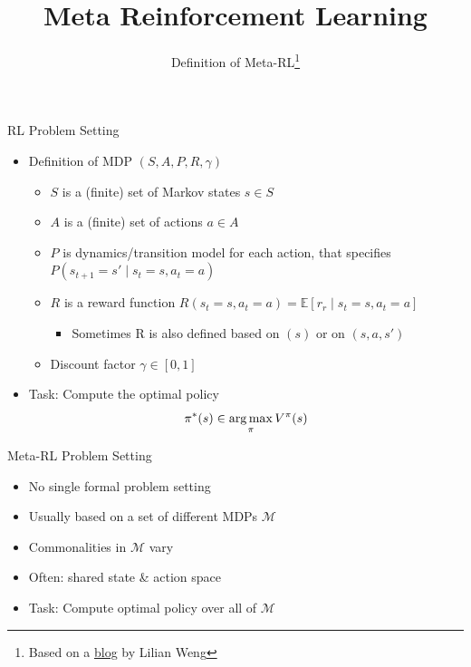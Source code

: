


\title[Meta-RL]{Meta Reinforcement Learning}
\subtitle{Definition of Meta-RL\footnote{Based on a \href{https://lilianweng.github.io/lil-log/2019/06/23/meta-reinforcement-learning.html}{blog} by Lilian Weng}}



	
	\maketitle

\begin{frame}[c]{RL Problem Setting}

\begin{itemize}
	\item Definition of MDP $(S,A,P, R, \gamma)$
	\begin{itemize}
		\item $S$ is a (finite) set of Markov states $s \in S$
		\item $A$ is a (finite) set of actions $a \in A$
		\item $P$ is dynamics/transition model for each action, that specifies $P(s_{t+1} = s' \mid s_t=s, a_t=a)$
		\item $R$ is a reward function 
		$R(s_t=s, a_t=a) = \mathbb{E}[r_r \mid s_t=s, a_t=a] $
		\begin{itemize}
			\item Sometimes R is also defined based on $(s)$ or on $(s,a,s')$
		\end{itemize}
		\item Discount factor $\gamma \in [0, 1]$
	\end{itemize}
	\bigskip
	\item Task: Compute the optimal policy
		$$ \pi^*(s)  \in \operatorname*{arg\,max}_\pi V^\pi(s)$$
\end{itemize}


\end{frame}
\begin{frame}[c]{Meta-RL Problem Setting}
	
\begin{itemize}
	\item No single formal problem setting
	\item Usually based on a set of different MDPs $\mathcal{M}$ 
	\item Commonalities in $\mathcal{M}$ vary
	\item Often: shared state \& action space
	\item Task: Compute optimal policy over all of $\mathcal{M}$
\end{itemize}
	
\end{frame}
